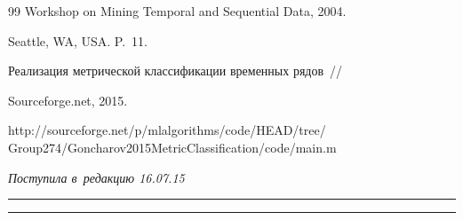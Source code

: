 {{\begin{thebibliography}{99}
    Workshop on Mining Temporal and Sequential Data, 2004. 

    Seattle, WA, USA. P.~11.


     Реализация метрической классификации временных рядов~/\!\!/ 

    Sourceforge.net, 2015. 

    {\sf http://sourceforge.net/p/mlalgorithms/code/HEAD/tree/ Group274/Goncharov2015MetricClassification/code/main.m}



   \end{thebibliography}

} }





\vspace*{-6pt}



\hfill{\small\textit{Поступила в~редакцию 16.07.15}}









\vspace*{9pt}



\hrule



\vspace*{2pt}



\hrule










\def\tit{METRIC TIME SERIES CLASSIFICATION USING DYNAMIC WARPING 

RELATIVE TO CENTROIDS OF CLASSES}



\def\titkol{Metric time series classification using dynamic warping 

relative to centroids of classes}





\def\aut{A.\,V.~Goncharov$^1$,  M.\,S.~Popova$^1$, and~V.\,V.~Strijov$^2$}

\def\autkol{A.\,V.~Goncharov,  M.\,S.~Popova, and~V.\,V.~Strijov}








